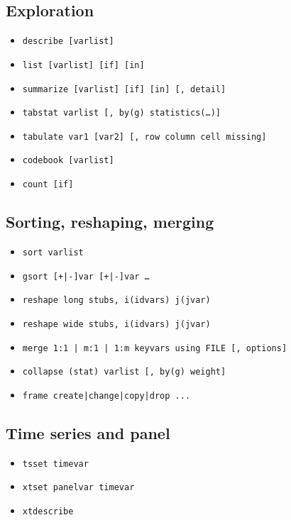 \documentclass[11pt,letterpaper]{article}
\begin{document}
\subsection*{Exploration}
\begin{itemize}[leftmargin=*,itemsep=0pt]
\item \texttt{describe [varlist]}
\item \texttt{list [varlist] [if] [in]}
\item \texttt{summarize [varlist] [if] [in] [, detail]}
\item \texttt{tabstat varlist [, by(g) statistics(\ldots)]}
\item \texttt{tabulate var1 [var2] [, row column cell missing]}
\item \texttt{codebook [varlist]}
\item \texttt{count [if]}
\end{itemize}

\subsection*{Sorting, reshaping, merging}
\begin{itemize}[leftmargin=*,itemsep=0pt]
\item \texttt{sort varlist}
\item \texttt{gsort [+|-]var [+|-]var \ldots}
\item \texttt{reshape long stubs, i(idvars) j(jvar)}
\item \texttt{reshape wide stubs, i(idvars) j(jvar)}
\item \texttt{merge 1:1 | m:1 | 1:m keyvars using FILE [, options]}
\item \texttt{collapse (stat) varlist [, by(g) weight]}
\item \texttt{frame create|change|copy|drop ...}
\end{itemize}

\subsection*{Time series and panel}
\begin{itemize}[leftmargin=*,itemsep=0pt]
\item \texttt{tsset timevar}
\item \texttt{xtset panelvar timevar}
\item \texttt{xtdescribe}
\end{itemize}
\end{document}
